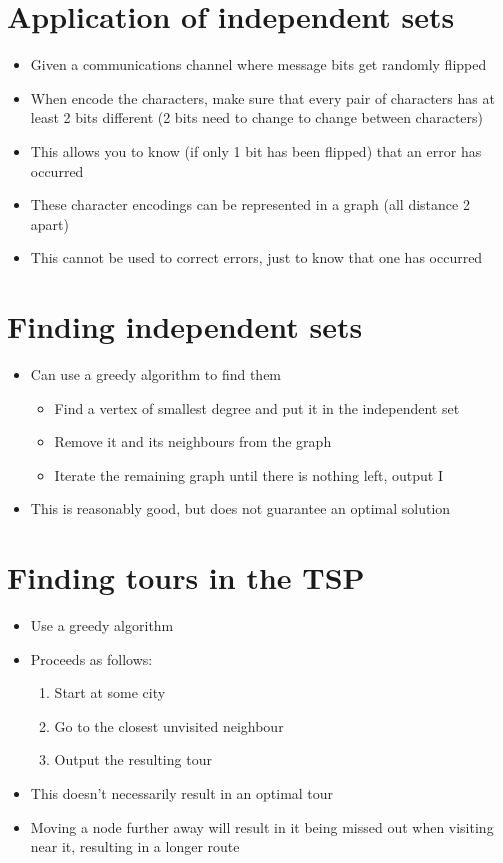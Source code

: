 \documentclass{article}[18pt]
\begin{document}
\section{Application of independent sets}
\begin{itemize}
\item Given a communications channel where message bits get randomly flipped
\item When encode the characters, make sure that every pair of characters has at least 2 bits different (2 bits need to change to change between characters)
\item This allows you to know (if only 1 bit has been flipped) that an error has occurred
\item These character encodings can be represented in a graph (all distance 2 apart)
\item This cannot be used to correct errors, just to know that one has occurred
\end{itemize}
\section{Finding independent sets}
\begin{itemize}
\item Can use a greedy algorithm to find them
\begin{itemize}
\item Find a vertex of smallest degree and put it in the independent set
\item Remove it and its neighbours from the graph
\item Iterate the remaining graph until there is nothing left, output I
\end{itemize}
\item This is reasonably good, but does not guarantee an optimal solution
\end{itemize}
\section{Finding tours in the TSP}
\begin{itemize}
	\item Use a greedy algorithm
	\item Proceeds as follows:
	\begin{enumerate}
		\item Start at some city
		\item Go to the closest unvisited neighbour
		\item Output the resulting tour 
	\end{enumerate}
	\item This doesn't necessarily result in an optimal tour
	\item Moving a node further away will result in it being missed out when visiting near it, resulting in a longer route
\end{itemize}
\end{document}
